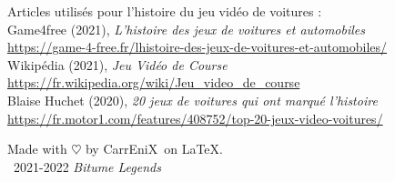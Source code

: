 \documentclass[11pt,a4paper]{article}
\newcommand{\btmlgs}{\textit{Bitume Legends}}
\newcommand{\CEX}{CarrEniX}
\begin{document}
\begin{thebibliography}{9}
  Articles utilisés pour l'histoire du jeu vidéo de voitures :\\

  Game4free (2021), \emph{L'histoire des jeux de voitures et automobiles}\\
  \url{https://game-4-free.fr/lhistoire-des-jeux-de-voitures-et-automobiles/}\\

  Wikipédia (2021), \emph{Jeu Vidéo de Course} \\
  \url{https://fr.wikipedia.org/wiki/Jeu_video_de_course}\\

  Blaise Huchet (2020), \emph{20 jeux de voitures qui ont marqué l'histoire}\\
  \url{https://fr.motor1.com/features/408752/top-20-jeux-video-voitures/}
\end{thebibliography}

\begin{center}
  Made with $\heartsuit$ by \CEX\, on \LaTeX.\\
\textcopyright\, 2021-2022 \btmlgs
\end{center}
\end{document}
